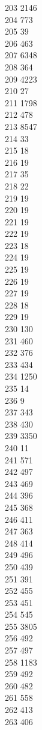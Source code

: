 { 203	2146 \\
 204	773 \\
 205	39 \\
 206	463 \\
 207	6348 \\
 208	364 \\
 209	4223 \\
 210	27 \\
 211	1798 \\
 212	478 \\
 213	8547 \\
 214	33 \\
 215	18 \\
 216	19 \\
 217	35 \\
 218	22 \\
 219	19 \\
 220	19 \\
 221	19 \\
 222	19 \\
 223	18 \\
 224	19 \\
 225	19 \\
 226	19 \\
 227	19 \\
 228	18 \\
 229	19 \\
 230	130 \\
 231	460 \\
 232	376 \\
 233	434 \\
 234	1250 \\
 235	14 \\
 236	9 \\
 237	343 \\
 238	430 \\
 239	3350 \\
 240	11 \\
 241	571 \\
 242	497 \\
 243	469 \\
 244	396 \\
 245	368 \\
 246	411 \\
 247	363 \\
 248	414 \\
 249	496 \\
 250	439 \\
 251	391 \\
 252	455 \\
 253	451 \\
 254	545 \\
 255	3805 \\
 256	492 \\
 257	497 \\
 258	1183 \\
 259	492 \\
 260	482 \\
 261	558 \\
 262	413 \\
 263	406 \\
}
